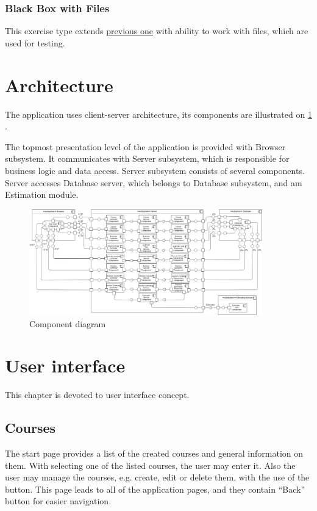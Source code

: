             \subsubsection{Black Box with Files}
            This exercise type extends \hyperref[subsubsec:blackbox]{previous one} with ability to work with files, which are used for testing.


    \section{Architecture}
    The application uses client-server architecture, its components are illustrated on \ref{fig:component-diagram} .
    
    The topmost presentation level of the application is provided with Browser subsystem. It communicates with Server subsystem, which is responsible for business logic and data access. Server subsystem consists of several components. Server accesses Database server, which belongs to Database subsystem, and am Estimation module.
    
    \begin{figure}
    \centerline{
        \includegraphics[width=0.9\textwidth, width=\linewidth]
        {images/component-diagram.png}}
    \caption{Component diagram}
    \label{fig:component-diagram}
    \end{figure}

    \section{User interface}
    This chapter is devoted to user interface concept.
    
        \subsection{Courses}
        The start page provides a list of the created courses and general information on them. With selecting one of the listed courses, the user may enter it. Also the user may manage the courses, e.g. create, edit or delete them, with the use of the button. This page leads to all of the application pages, and they contain ``Back'' button for easier navigation.
    
